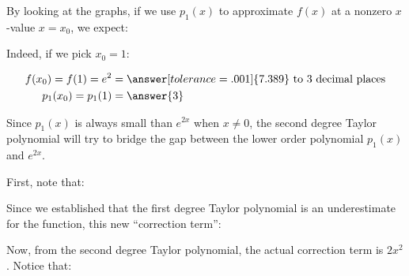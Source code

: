 \documentclass{ximera}
\begin{document}
\begin{exercise}
\begin{exercise}
\begin{image}
\begin{tikzpicture}
\end{tikzpicture}
\end{image}

By looking at the graphs, if we use $p_1(x)$ to approximate $f(x)$ at a nonzero $x$-value $x=x_0$, we expect:
\begin{multipleChoice}
\end{multipleChoice}

Indeed, if we pick $x_0 = 1$:

\begin{align*}
f(x_0)=f(1) = e^2 &= \answer[tolerance=.001]{7.389} \textrm{ to $3$ decimal places}\\
p_1(x_0) = p_1(1) &= \answer{3}
\end{align*}

\end{exercise}

\begin{exercise}
Since $p_1(x)$ is always small than $e^{2x}$ when $x \neq 0$, the second degree Taylor polynomial will try to bridge the gap between the lower order polynomial $p_1(x)$ and $e^{2x}$.  

First, note that:

\begin{image}
  \end{image}

Since we established that the first degree Taylor polynomial is an underestimate for the function, this new ``correction term'':

\begin{multipleChoice}
\end{multipleChoice}

Now, from the second degree Taylor polynomial, the actual correction term is $2x^2$.  Notice that:
\begin{multipleChoice}
\end{multipleChoice}


\end{exercise}
\end{exercise}
\end{document}
